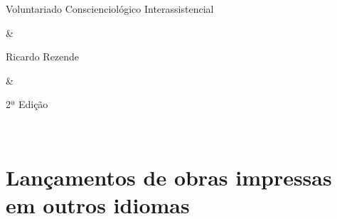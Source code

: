 \documentclass{gescons}
\begin{document}
\begin{longtable}[]
\hline
\begin{minipage}[t]{\linewidth}\raggedright
Voluntariado Conscienciológico Interassistencial
\end{minipage} & \begin{minipage}[t]{\linewidth}\raggedright
Ricardo Rezende
\end{minipage} & \begin{minipage}[t]{\linewidth}\centering
2ª Edição
\end{minipage} \\
\midrule\noalign{}
\endhead
\bottomrule\noalign{}
\endlastfoot
\end{longtable}
















\section*{Lançamentos de obras impressas em outros idiomas}
\end{document}
